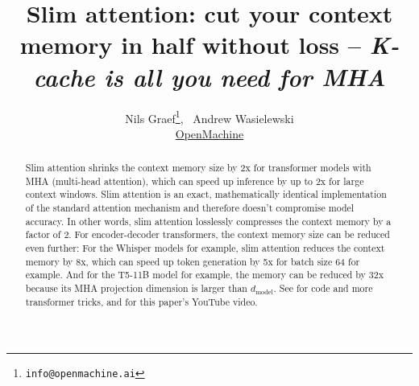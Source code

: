 \documentclass{article}
\title{Slim attention: cut your context memory in half without loss -- \emph{K-cache is all you need for MHA}}
\author{Nils Graef\thanks{\texttt{info@openmachine.ai}}, \, Andrew Wasielewski \\
  \href{https://openmachine.ai}{OpenMachine}}
\begin{document}
 \maketitle

\begin{abstract}
  Slim attention shrinks the context memory size by 2x for transformer models with MHA (multi-head attention), which can speed up inference by up to 2x for large context windows. Slim attention is an exact, mathematically identical implementation of the standard attention mechanism and therefore doesn’t compromise model accuracy. In other words, slim attention losslessly compresses the context memory by a factor of 2. For encoder-decoder transformers, the context memory size can be reduced even further: For the Whisper models for example, slim attention reduces the context memory by 8x, which can speed up token generation by 5x for batch size 64 for example. And for the T5-11B model for example, the memory can be reduced by 32x because its MHA projection dimension is larger than $d_{\text{model}}$. See \citep{tricks} for code and more transformer tricks, and \citep{slim-video} for this paper's YouTube video.
\end{abstract}
\end{document}
